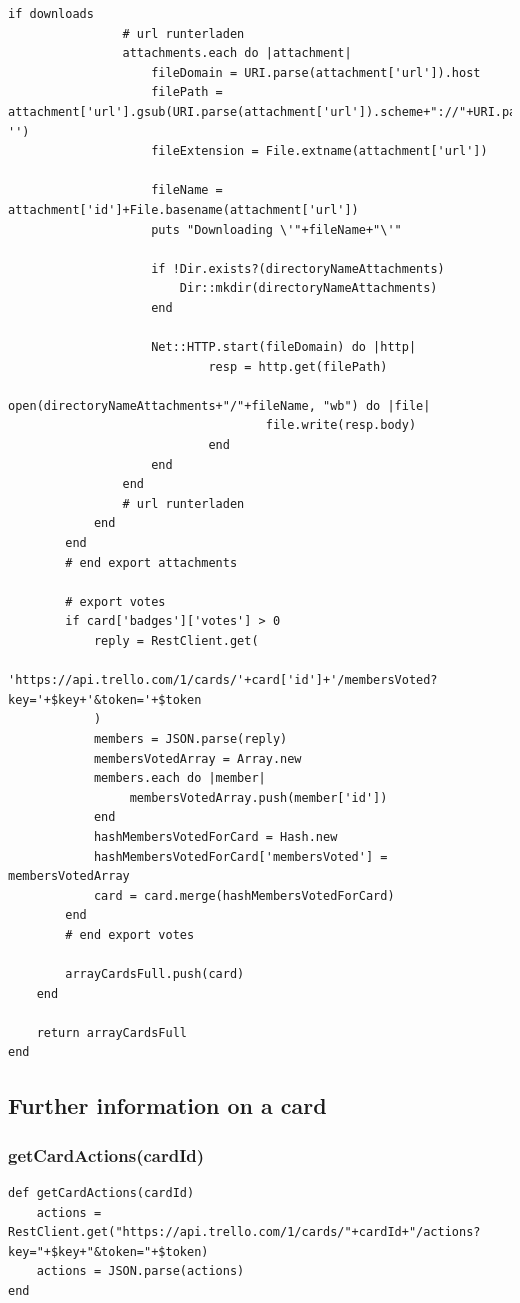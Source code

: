 \begin{lstlisting}[aboveskip=1\baselineskip, caption= getCardsAsArray(), label=listing063]
			if downloads
				# url runterladen
				attachments.each do |attachment|
					fileDomain = URI.parse(attachment['url']).host
					filePath = attachment['url'].gsub(URI.parse(attachment['url']).scheme+"://"+URI.parse(attachment['url']).host, '')
					fileExtension = File.extname(attachment['url'])
					
					fileName = attachment['id']+File.basename(attachment['url'])
					puts "Downloading \'"+fileName+"\'"
								
					if !Dir.exists?(directoryNameAttachments)
						Dir::mkdir(directoryNameAttachments)
					end
					
					Net::HTTP.start(fileDomain) do |http|
							resp = http.get(filePath)
							open(directoryNameAttachments+"/"+fileName, "wb") do |file|
									file.write(resp.body)
							end
					end      
				end
				# url runterladen
			end       
		end	
		# end export attachments
		
		# export votes
		if card['badges']['votes'] > 0
			reply = RestClient.get(
					'https://api.trello.com/1/cards/'+card['id']+'/membersVoted?key='+$key+'&token='+$token
			)
			members = JSON.parse(reply)
			membersVotedArray = Array.new
			members.each do |member|
				 membersVotedArray.push(member['id'])
			end
			hashMembersVotedForCard = Hash.new			
			hashMembersVotedForCard['membersVoted'] = membersVotedArray
			card = card.merge(hashMembersVotedForCard)	
		end
		# end export votes
		
		arrayCardsFull.push(card)
	end
	
	return arrayCardsFull
end
\end{lstlisting}


\subsection{Further information on a card}

\subsubsection{getCardActions(cardId)}
\begin{lstlisting}[aboveskip=1\baselineskip, caption=getCardActions(), label=listing051]
def getCardActions(cardId)
	actions = RestClient.get("https://api.trello.com/1/cards/"+cardId+"/actions?key="+$key+"&token="+$token)
	actions = JSON.parse(actions)
end
\end{lstlisting}


